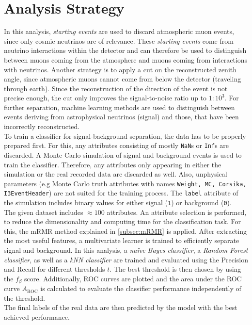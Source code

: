 \section{Analysis Strategy}
\label{sec:Strategy}
In this analysis, \textit{starting events} are used to discard atmospheric muon events, since only cosmic neutrinos are of relevance. These \textit{starting events} come from neutrino
interactions within the detector and can therefore be used to distinguish between muons coming from the atmosphere and muons coming from interactions with neutrinos. Another strategy is 
to apply a cut on the reconstructed zenith angle, since atmospheric muons cannot come from below the detector (traveling through earth).
Since the reconstruction of the direction of the event is not precise enough, the cut only improves the signal-to-noise ratio up to $1:10^3$. For further separation, machine learning
methods are used to distinguish between events deriving from astrophysical neutrinos (signal) and those, that have been incorrectly reconstructed.\\
To train a classifier for signal-background separation, the data has to be properly prepared first. For this, any attributes consisting of mostly \texttt{NaN}s or \texttt{Inf}s are discarded.
A Monte Carlo simulation of signal and background events is used to train the classifier. Therefore, any attributes only appearing in either the simulation or the real recorded data are
discarded as well. Also, unphysical parameters (e.g Monte Carlo truth attributes with names \texttt{Weight, MC, Corsika, I3EventHeader}) are not suited for the training process. The \texttt{label}
attribute of the simulation includes binary values for either signal (\texttt{1}) or background (\texttt{0}).\\
The given dataset includes $\approx 100$ attributes. An attribute selection is performed, to reduce the dimensionality and computing time for the classification task. For this, the mRMR method explained
in \ref{subsec:mRMR} is applied. After extracting the most useful features, a multivariate learner is trained to efficiently separate signal and background. In this analysis, a \textit{na\"ive Bayes classifier},
a \textit{Random Forest classifier}, as well as a \textit{kNN classifier} are trained and evaluated using the Precision and Recall for different thresholds $t$. The best threshold is then chosen by 
using the $f_{\beta}$ score. Additionally, ROC curves are plotted and the area under the ROC curve $A_{\mathrm{ROC}}$ is calculated to evaluate the classifier performance independently of the threshold.\\
The final labels of the real data are then predicted by the model with the best achieved performance.

